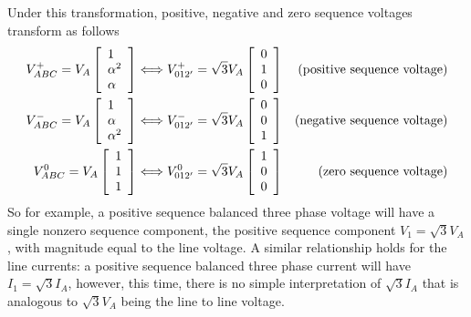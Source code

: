 \documentclass[11pt]{article}
\begin{document}
Under this transformation, positive, negative and zero sequence voltages transform as follows
\begin{align}
V_{ABC}^+ = V_A\left[\begin{array}{l} 
	1 \\ \alpha^2 \\ \alpha 
\end{array}\right] &\Longleftrightarrow 
V_{012'}^+ = \sqrt{3}V_A\left[\begin{array}{l} 
	0 \\ 1 \\ 0
\end{array}\right] & \text{(positive sequence voltage)}\notag \\
V_{ABC}^- = V_A\left[\begin{array}{l} 
	1 \\ \alpha \\ \alpha^2
\end{array}\right] &\Longleftrightarrow 
V_{012'}^- = \sqrt{3}V_A\left[\begin{array}{l} 
	0 \\ 0 \\ 1
\end{array}\right] & \text{(negative sequence voltage)}\notag \\
V_{ABC}^0 = V_A\left[\begin{array}{l} 
	1 \\ 1 \\ 1
\end{array}\right] &\Longleftrightarrow 
V_{012'}^0 = \sqrt{3}V_A\left[\begin{array}{l} 
	1 \\ 0 \\ 0
\end{array}\right] & \text{(zero sequence voltage)}\notag \\
\end{align}
So for example, a positive sequence balanced three phase voltage will have a single nonzero sequence component, the positive sequence component $V_1 = \sqrt{3}V_A$, with magnitude equal to the line voltage. A similar relationship holds for the line currents: a positive sequence balanced three phase current will have $I_1 = \sqrt{3}I_A$, however, this time, there is no simple interpretation of $\sqrt{3}I_A$ that is analogous to $\sqrt{3}V_A$ being the line to line voltage.
\end{document}
